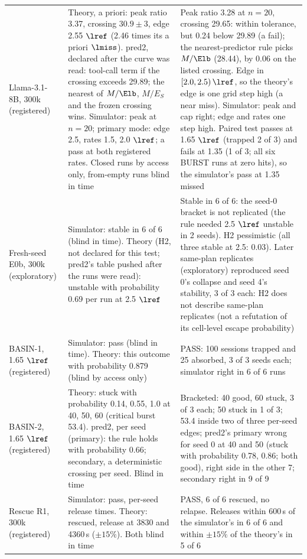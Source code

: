 \begin{table}[!tp]
\begin{tabular}{@{}>{\raggedright\arraybackslash}p{3.0cm} >{\raggedright\arraybackslash}p{7.4cm} >{\raggedright\arraybackslash}p{6.5cm}@{}}
Llama-3.1-8B, 300k (registered) & Theory, a priori: peak ratio 3.37, crossing $30.9\pm3$, edge 2.55 $\lref$ (2.46 times its a priori $\lmiss$). pred2, declared after the curve was read: tool-call term if the crossing exceeds 29.89; the nearest of $M/\Elb$, $M/E_S$ and the frozen crossing wins. Simulator: peak at $n=20$; primary mode: edge 2.5, rates 1.5, 2.0 $\lref$; a pass at both registered rates. Closed runs by access only, from-empty runs blind in time & Peak ratio 3.28 at $n=20$, crossing 29.65: within tolerance, but 0.24 below 29.89 (a fail); the nearest-predictor rule picks $M/\Elb$ (28.44), by 0.06 on the listed crossing. Edge in $[2.0,2.5)\,\lref$, so the theory's edge is one grid step high (a near miss). Simulator: peak and cap right; edge and rates one step high. Paired test passes at 1.65 $\lref$ (trapped 2 of 3) and fails at 1.35 (1 of 3; all six BURST runs at zero hits), so the simulator's pass at 1.35 missed\\
\addlinespace[0.3pt]
Fresh-seed E0b, 300k (exploratory) & Simulator: stable in 6 of 6 (blind in time). Theory (H2, not declared for this test; pred2's table pushed after the runs were read): unstable with probability 0.69 per run at 2.5 $\lref$ & Stable in 6 of 6: the seed-0 bracket is not replicated (the rule needed 2.5 $\lref$ unstable in 2 seeds). H2 pessimistic (all three stable at 2.5: 0.03). Later same-plan replicates (exploratory) reproduced seed 0's collapse and seed 4's stability, 3 of 3 each: H2 does not describe same-plan replicates (not a refutation of its cell-level escape probability)\\
\addlinespace[0.3pt]
BASIN-1, 1.65 $\lref$ (registered) & Simulator: pass (blind in time). Theory: this outcome with probability 0.879 (blind by access only) & PASS: 100 sessions trapped and 25 absorbed, 3 of 3 seeds each; simulator right in 6 of 6 runs\\
\addlinespace[0.3pt]
BASIN-2, 1.65 $\lref$ (registered) & Theory: stuck with probability 0.14, 0.55, 1.0 at 40, 50, 60 (critical burst 53.4). pred2, per seed (primary): the rule holds with probability 0.66; secondary, a deterministic crossing per seed. Blind in time & Bracketed: 40 good, 60 stuck, 3 of 3 each; 50 stuck in 1 of 3; 53.4 inside two of three per-seed edges; pred2's primary wrong for seed 0 at 40 and 50 (stuck with probability 0.78, 0.86; both good), right side in the other 7; secondary right in 9 of 9\\
\addlinespace[0.3pt]
Rescue R1, 300k (registered) & Simulator: pass, per-seed release times. Theory: rescued, release at 3830 and 4360\,s ($\pm15\%$). Both blind in time & PASS, 6 of 6 rescued, no relapse. Releases within 600\,s of the simulator's in 6 of 6 and within $\pm15\%$ of the theory's in 5 of 6\\

\end{tabular}
\end{table}
